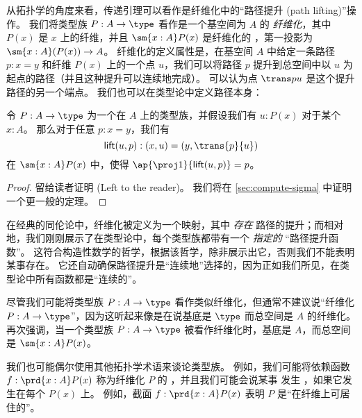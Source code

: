 从拓扑学的角度来看，传递引理可以看作是纤维化中的“路径提升 (path lifting)”操作。
%
%
我们将类型族 $P:A\to \type$ 看作是一个基空间为 $A$ 的 \emph{纤维化}，其中 $P(x)$ 是 $x$ 上的纤维，并且 $\sm{x:A}P(x)$ 是纤维化的 ，第一投影为 $\sm{x:A}(P(x))\to A$。
纤维化的定义属性是，在基空间 $A$ 中给定一条路径 $p:x=y$ 和纤维 $P(x)$ 上的一个点 $u$，我们可以将路径 $p$ 提升到总空间中以 $u$ 为起点的路径（并且这种提升可以连续地完成）。
可以认为点 $\trans p u$ 是这个提升路径的另一个端点。
我们也可以在类型论中定义路径本身：

\begin{lem}\label{thm:path-lifting}
%
%
令 $P:A\to\type$ 为一个在 $A$ 上的类型族，并假设我们有 $u:P(x)$ 对于某个 $x:A$。
那么对于任意 $p:x=y$，我们有
\begin{equation*}
\mathsf{lift}(u,p):(x,u)=(y,\trans{p}{u})
\end{equation*}
在 $\sm{x:A}P(x)$ 中，使得 $\ap{\proj1}{\mathsf{lift}(u,p)} = p$。
\end{lem}
\begin{proof}
留给读者证明 (Left to the reader)。
我们将在 \cref{sec:compute-sigma} 中证明一个更一般的定理。
\end{proof}

在经典的同伦论中，纤维化被定义为一个映射，其中 \emph{存在} 路径的提升；而相对地，我们刚刚展示了在类型论中，每个类型族都带有一个 \emph{指定的} “路径提升函数”。
这符合构造性数学的哲学，根据该哲学，除非展示出它，否则我们不能表明某事存在。
%
它还自动确保路径提升是“连续地”选择的，因为正如我们所见，在类型论中所有函数都是“连续的”。

\begin{rmk}
尽管我们可能将类型族 $P:A\to \type$ 看作类似纤维化，但通常不建议说“纤维化 $P:A\to\type$”，因为这听起来像是在说基底是 $\type$ 而总空间是 $A$ 的纤维化。
再次强调，当一个类型族 $P:A\to \type$ 被看作纤维化时，基底是 $A$，而总空间是 $\sm{x:A} P(x)$。

我们也可能偶尔使用其他拓扑学术语来谈论类型族。
例如，我们可能将依赖函数 $f:\prd{x:A} P(x)$ 称为纤维化 $P$ 的 
%
，并且我们可能会说某事  发生
%
，如果它发生在每个 $P(x)$ 上。
例如，截面 $f:\prd{x:A} P(x)$ 表明 $P$ 是“在纤维上可居住的”。
\end{rmk}

